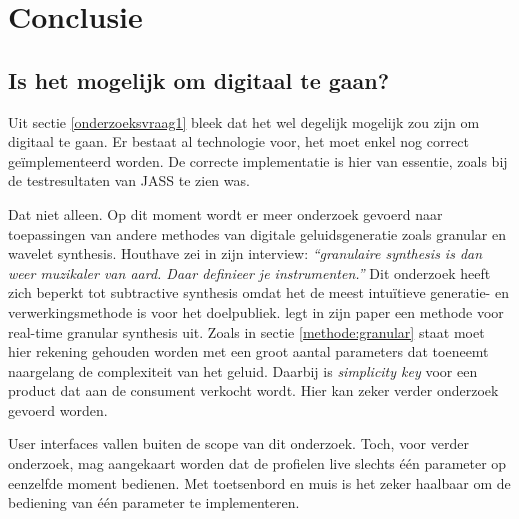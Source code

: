 
\chapter{Conclusie}
\label{ch:conclusie}


\section{Is het mogelijk om digitaal te gaan?}

Uit sectie \ref{onderzoeksvraag1} bleek dat het wel degelijk mogelijk zou zijn om digitaal te gaan. Er bestaat al technologie voor, het moet enkel nog correct geïmplementeerd worden. De correcte implementatie is hier van essentie, zoals bij de testresultaten van JASS te zien was.

Dat niet alleen. Op dit moment wordt er meer onderzoek gevoerd naar toepassingen van andere methodes van digitale geluidsgeneratie zoals granular en wavelet synthesis. Houthave zei in zijn interview: \textit{``granulaire synthesis is dan weer muzikaler van aard. Daar definieer je instrumenten.''} \autocite{thomashouthave} Dit onderzoek heeft zich beperkt tot subtractive synthesis omdat het de meest intuïtieve generatie- en verwerkingsmethode is voor het doelpubliek. \textcite{granular} legt in zijn paper een methode voor real-time granular synthesis uit. Zoals in sectie \ref{methode:granular} staat moet hier rekening gehouden worden met een groot aantal parameters dat toeneemt naargelang de complexiteit van het geluid. Daarbij is \textit{simplicity key} voor een product dat aan de consument verkocht wordt. Hier kan zeker verder onderzoek gevoerd worden.

User interfaces vallen buiten de scope van dit onderzoek. Toch, voor verder onderzoek, mag aangekaart worden dat de profielen live slechts één parameter op eenzelfde moment bedienen. Met toetsenbord en muis is het zeker haalbaar om de bediening van één parameter te implementeren.

